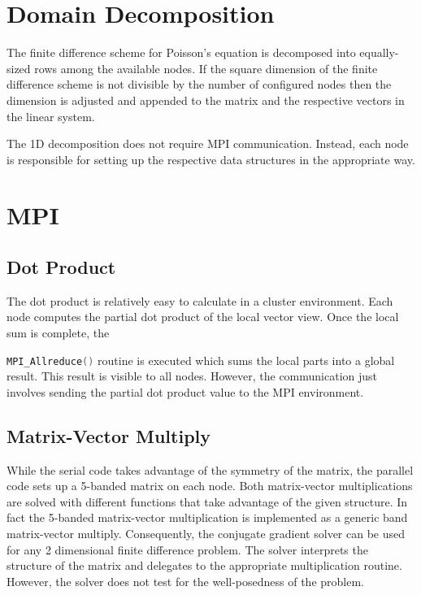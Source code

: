 \documentclass[12pt,a4paper]{report}
\def\ccode#1{
  \lstinline[basicstyle=\ttfamily,language=C]{#1} }
\begin{document}
\section{Domain Decomposition}
\label{sec:domain-decomposition}

The finite difference scheme for Poisson's equation is decomposed into
equally-sized rows among the available nodes. If the square dimension
of the finite difference scheme is not divisible by the number of
configured nodes then the dimension is adjusted and appended to the
matrix and the respective vectors in the linear system.

The 1D decomposition does not require MPI communication. Instead, each
node is responsible for setting up the respective data structures in
the appropriate way.


\section{MPI}
\label{sec:mpi}

\subsection{Dot Product}
\label{sec:dot-product}

The dot product is relatively easy to calculate in a cluster
environment. Each node computes the partial dot product of the local
vector view. Once the local sum is complete, the
\ccode{MPI_Allreduce()} routine is executed which sums the local parts
into a global result. This result is visible to all nodes. However,
the communication just involves sending the partial dot product value
to the MPI environment.

\subsection{Matrix-Vector Multiply}
\label{sec:matr-vect-mult}

While the serial code takes advantage of the symmetry of the matrix,
the parallel code sets up a 5-banded matrix on each node. Both
matrix-vector multiplications are solved with different functions that
take advantage of the given structure. In fact the 5-banded
matrix-vector multiplication is implemented as a generic band
matrix-vector multiply. Consequently, the conjugate gradient solver
can be used for any 2 dimensional finite difference problem. The
solver interprets the structure of the matrix and delegates to the
appropriate multiplication routine. However, the solver does not test
for the well-posedness of the problem.
\end{document}
